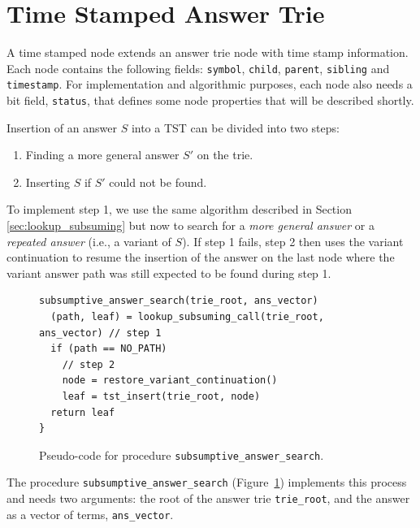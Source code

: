 \section{Time Stamped Answer Trie}

A time stamped node extends an answer trie node with time stamp information.
Each node contains the following fields: \texttt{symbol}, \texttt{child}, \texttt{parent}, \texttt{sibling}
and \texttt{timestamp}. For implementation and algorithmic purposes, each node also needs a bit field,
\texttt{status}, that defines some node properties that will be described shortly.

Insertion of an answer $S$ into a TST can be divided into two steps:

\begin{enumerate}
  \item Finding a more general answer $S'$ on the trie.
  \item Inserting $S$ if $S'$ could not be found.
\end{enumerate}

To implement step 1, we use the same algorithm described in Section \ref{sec:lookup_subsuming}
but now to search for a \textit{more general answer} or a \textit{repeated answer} (i.e., a variant of $S$).
If step 1 fails, step 2 then uses the variant continuation to resume the insertion of the answer
on the last node where the variant answer path was still expected to be found during step 1.

\begin{figure}[ht]
\begin{Verbatim}
subsumptive_answer_search(trie_root, ans_vector)
  (path, leaf) = lookup_subsuming_call(trie_root, ans_vector) // step 1
  if (path == NO_PATH)
    // step 2
    node = restore_variant_continuation()
    leaf = tst_insert(trie_root, node)
  return leaf
}
\end{Verbatim}
\caption{Pseudo-code for procedure \texttt{subsumptive\_answer\_search}.}
\label{fig:subsumptive_answer_search}
\end{figure}

The procedure \texttt{subsumptive\_answer\_search} (Figure~\ref{fig:subsumptive_answer_search})
implements this process and needs two arguments: the root of the answer trie \texttt{trie\_root}, and
the answer as a vector of terms, \texttt{ans\_vector}.

